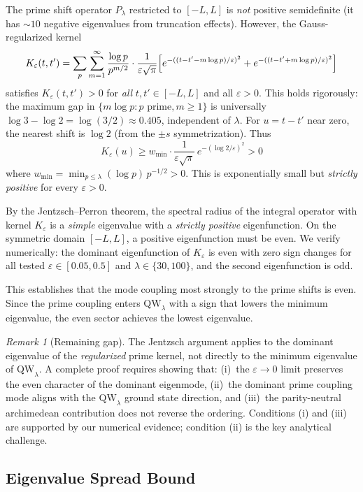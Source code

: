 \documentclass[12pt,a4paper]{article}
\theoremstyle{definition}
\theoremstyle{remark}
\newtheorem{remark}[theorem]{Remark}
\begin{document}
The prime shift operator $P_\lambda$ restricted to $[-L,L]$ is \emph{not} positive semidefinite (it has $\sim 10$ negative eigenvalues from truncation effects). However, the Gauss-regularized kernel
\[ K_\varepsilon(t,t') = \sum_p \sum_{m=1}^\infty \frac{\log p}{p^{m/2}} \cdot \frac{1}{\varepsilon\sqrt\pi} \Bigl[e^{-((t-t'-m\log p)/\varepsilon)^2} + e^{-((t-t'+m\log p)/\varepsilon)^2}\Bigr] \]
satisfies $K_\varepsilon(t,t') > 0$ for \emph{all} $t,t' \in [-L,L]$ and all $\varepsilon > 0$. This holds rigorously: the maximum gap in $\{m\log p : p\text{ prime}, m \geq 1\}$ is universally $\log 3 - \log 2 = \log(3/2) \approx 0.405$, independent of $\lambda$. For $u = t-t'$ near zero, the nearest shift is $\log 2$ (from the $\pm s$ symmetrization). Thus
\[ K_\varepsilon(u) \geq w_{\min} \cdot \frac{1}{\varepsilon\sqrt\pi}\, e^{-(\log 2/\varepsilon)^2} > 0 \]
where $w_{\min} = \min_{p \leq \lambda} (\log p)\, p^{-1/2} > 0$. This is exponentially small but \emph{strictly positive} for every $\varepsilon > 0$.

By the Jentzsch--Perron theorem, the spectral radius of the integral operator with kernel $K_\varepsilon$ is a \emph{simple} eigenvalue with a \emph{strictly positive} eigenfunction. On the symmetric domain $[-L,L]$, a positive eigenfunction must be even. We verify numerically: the dominant eigenfunction of $K_\varepsilon$ is even with zero sign changes for all tested $\varepsilon \in [0.05, 0.5]$ and $\lambda \in \{30, 100\}$, and the second eigenfunction is odd.

This establishes that the mode coupling most strongly to the prime shifts is even. Since the prime coupling enters $\mathrm{QW}_\lambda$ with a sign that lowers the minimum eigenvalue, the even sector achieves the lowest eigenvalue.

\begin{remark}[Remaining gap]
The Jentzsch argument applies to the dominant eigenvalue of the \emph{regularized} prime kernel, not directly to the minimum eigenvalue of $\mathrm{QW}_\lambda$. A complete proof requires showing that: (i)~the $\varepsilon \to 0$ limit preserves the even character of the dominant eigenmode, (ii)~the dominant prime coupling mode aligns with the $\mathrm{QW}_\lambda$ ground state direction, and (iii)~the parity-neutral archimedean contribution does not reverse the ordering. Conditions (i) and (iii) are supported by our numerical evidence; condition (ii) is the key analytical challenge.
\end{remark}

\subsection{Eigenvalue Spread Bound}
\end{document}
